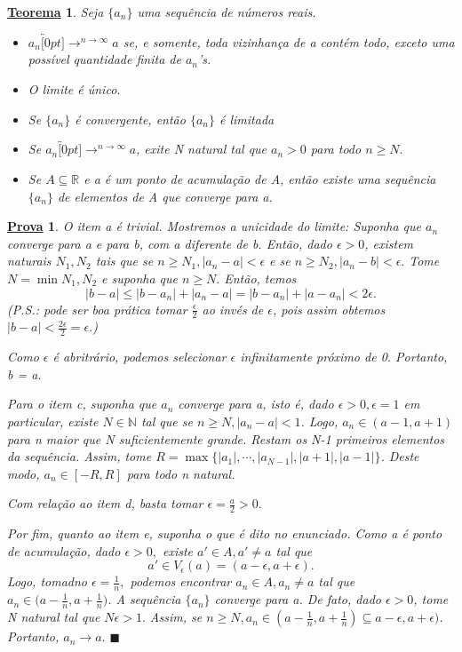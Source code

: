 \documentclass{article}
\newtheorem*{theorem*}{\underline{Teorema}}
\newtheorem*{proof*}{\underline{Prova}}
\renewcommand\qedsymbol{$\blacksquare$}
\begin{document}
\begin{theorem*}
  Seja $\{a_{n}\}$ uma sequ\^encia de n\'umeros reais.
 \begin{itemize}
   \item[a)] $a_{n}\overbracket[0pt]{\longrightarrow}^{n\rightarrow\infty}a$ se, e somente, toda vizinhan\c ca de a cont\'em todo, exceto uma poss\'ivel quantidade
  finita de $a_{n}$'s.
   \item[b)] O limite \'e \'unico.
   \item[c)] Se $\{a_{n}\}$ \'e convergente, ent\~ao $\{a_{n}\}$ \'e limitada
   \item[d)] Se $a_{n}\overbracket[0pt]{\longrightarrow}^{n\rightarrow\infty}a$, exite N natural tal que $a_{n} > 0$ para todo $n\geq{N}.$
   \item[e)] Se $A\subseteq{\mathbb{R}}$ e a \'e um ponto de acumula\c c\~ao de A, ent\~ao existe uma sequ\^encia $\{a_{n}\}$ de elementos
    de A que converge para a.
 \end{itemize}
\end{theorem*}
\begin{proof*}
  O item a \'e trivial. Mostremos a unicidade do limite: Suponha que $a_{n}$ converge para a e para b, com a diferente de b. Ent\~ao,
dado $\epsilon > 0$, existem naturais $N_{1}, N_{2}$ tais que se $n\geq{N_{1}}, |a_{n}-a|<\epsilon$ e se $n\geq{N_{2}}, |a_{n} - b| < \epsilon.$
Tome $N = \min{N_{1}, N_{2}}$ e suponha que $n \geq{N}.$ Ent\~ao, temos 
 $$
  |b - a| \leq{|b - a_{n}| + |a_{n} - a|} = |b - a_{n}| + |a - a_{n}| < 2\epsilon.
 $$
 (\textit{P.S.}: pode ser boa pr\'atica tomar $\frac{\epsilon}{2}$ ao inv\'es de $\epsilon$, pois assim obtemos $|b-a|<\frac{2\epsilon}{2}=\epsilon.$)

 Como $\epsilon$ \'e abritr\'ario, podemos selecionar $\epsilon$ infinitamente pr\'oximo de 0. Portanto, b = a.

 Para o item c, suponha que $a_{n}$ converge para a, isto \'e, dado $\epsilon > 0, \epsilon = 1$ em particular, existe 
 $N\in \mathbb{N}$ tal que se $n \geq{N}, |a_{n} - a| < 1$. Logo, $a_{n}\in(a - 1, a + 1)$ para n maior que N suficientemente grande.
 Restam os N-1 primeiros elementos da sequ\^encia. Assim, tome $R = \max{\biggl\{|a_{1}|, \cdots, |a_{N-1}|, |a + 1|, |a - 1|\biggr\}}$. Deste modo,
 $a_{n}\in[-R, R]$ para todo n natural. 

 Com rela\c c\~ao ao item d, basta tomar $\epsilon = \frac{a}{2} > 0.$ 

 Por fim, quanto ao item e, suponha o que \'e dito no enunciado. Como a \'e ponto de acumula\c c\~ao, dado $\epsilon > 0,$ existe
 $a'\in{A}, a'\neq a$ tal que 
 $$
  a'\in V_{\epsilon}(a) = (a - \epsilon, a + \epsilon).
 $$
 Logo, tomadno $\epsilon = \frac{1}{n},$ podemos encontrar $a_{n}\in A, a_{n}\neq a$ tal que $a_{n}\in\biggl(a-\frac{1}{n}, a + \frac{1}{n}\biggr)$. A sequ\^encia
 $\{a_{n}\}$ converge para a. De fato, dado $\epsilon > 0$, tome N natural tal que $N\epsilon > 1.$ Assim, se $n\geq{N}, a_{n}\in(a-\frac{1}{n}, a+\frac{1}{n})\subseteq{a-\epsilon}, a+\epsilon)$.
 Portanto, $a_{n}\rightarrow a.$ \qedsymbol
\end{proof*}
\end{document}
